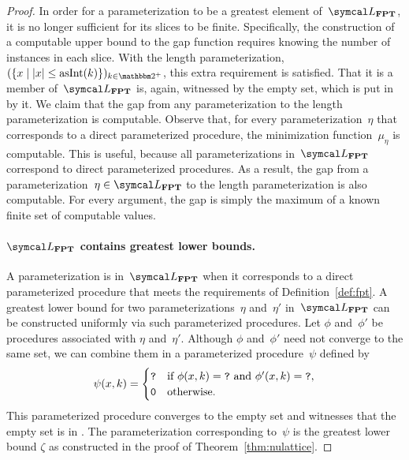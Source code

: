 \begin{proof}
  In order for a parameterization to be a greatest element of~$\calL_\cl{FPT}$, it is no longer sufficient for its slices to be finite.
  Specifically, the construction of a computable upper bound to the gap function requires knowing the number of instances in each slice.
  With the length parameterization, $(\{x \st \length{x} \le \asNat(k)\})_{k \in \binary^+}$, this extra requirement is satisfied.
  That it is a member of~$\calL_\cl{FPT}$ is, again, witnessed by the empty set, which is put in  by it.
  We claim that the gap from any parameterization to the length parameterization is computable.
  Observe that, for every parameterization~$\eta$ that corresponds to a direct parameterized procedure, the minimization function~$\mu_\eta$ is computable.
  This is useful, because all parameterizations in~$\calL_\cl{FPT}$ correspond to direct parameterized procedures.
  As a result, the gap from a parameterization~$\eta \in \calL_\cl{FPT}$ to the length parameterization is also computable.
  For every argument, the gap is simply the maximum of a known finite set of computable values.

  \paragraph{$\calL_\cl{FPT}$ contains greatest lower bounds.}
  A parameterization is in~$\calL_\cl{FPT}$ when it corresponds to a direct parameterized procedure that meets the requirements of Definition~\ref{def:fpt}.
  A greatest lower bound for two parameterizations~$\eta$ and~$\eta'$ in~$\calL_\cl{FPT}$ can be constructed uniformly via such parameterized procedures.
  Let $\phi$ and~$\phi'$ be procedures associated with $\eta$ and~$\eta'$.
  Although $\phi$ and~$\phi'$ need not converge to the same set, we can combine them in a parameterized procedure~$\psi$ defined by
  \begin{equation*}
    \psi(x, k) = \begin{cases}
      \textnormal{\texttt{?}}	&\text{if $\phi(x, k) = \textnormal{\texttt{?}}$ and $\phi'(x, k) = \textnormal{\texttt{?}}$}, \\
      \textnormal{\texttt{0}}	&\text{otherwise}.
    \end{cases}
  \end{equation*}
  This parameterized procedure converges to the empty set and witnesses that the empty set is in .
  The parameterization corresponding to~$\psi$ is the greatest lower bound $\zeta$ as constructed in the proof of Theorem~\ref{thm:nulattice}.


\end{proof}
